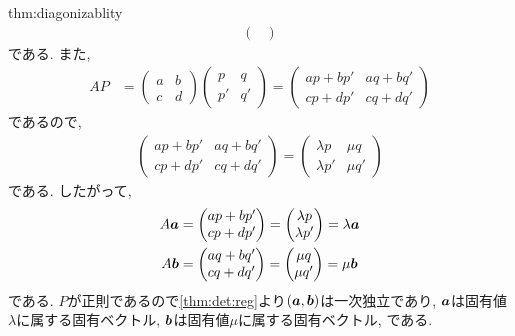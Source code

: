 \begin{proofof}{thm:diagonizablity}
\begin{align*}
\begin{pmatrix}
    \end{pmatrix}
  \end{align*}
  である.
  また,
  \begin{align*}
    AP&=
    \begin{pmatrix}
      a &b\\c&d
    \end{pmatrix}
    \begin{pmatrix}
      p&q\\p'&q'
    \end{pmatrix}=
    \begin{pmatrix}
      ap+bp' &aq+bq'\\cp+dp'&cq+dq'
    \end{pmatrix}
  \end{align*}
  であるので,
  \begin{align*}
    \begin{pmatrix}
      ap+bp' &aq+bq'\\cp+dp'&cq+dq'
    \end{pmatrix}
    =
    \begin{pmatrix}
      \lambda p&\mu q\\ \lambda p'&\mu q'
    \end{pmatrix}
  \end{align*}
  である.
  したがって,
  \begin{align*}
    A\boldsymbol{a}&=
        \begin{pmatrix}
      ap+bp' \\cp+dp'
    \end{pmatrix}
    =
    \begin{pmatrix}
      \lambda p\\ \lambda p'
    \end{pmatrix}
    =
    \lambda \boldsymbol{a}\\
    A\boldsymbol{b}&=
    \begin{pmatrix}
      aq+bq'\\cq+dq'
    \end{pmatrix}
    =
    \begin{pmatrix}
      \mu q\\\mu q'
    \end{pmatrix}
    =
    \mu \boldsymbol{b}
  \end{align*}
  である.
  $P$が正則であるので\cref{thm:det:reg}より$(\boldsymbol{a},\boldsymbol{b})$は一次独立であり,
  $\boldsymbol{a}$は固有値$\lambda$に属する固有ベクトル,
  $\boldsymbol{b}$は固有値$\mu$に属する固有ベクトル,
  である.
  

\end{proofof}
